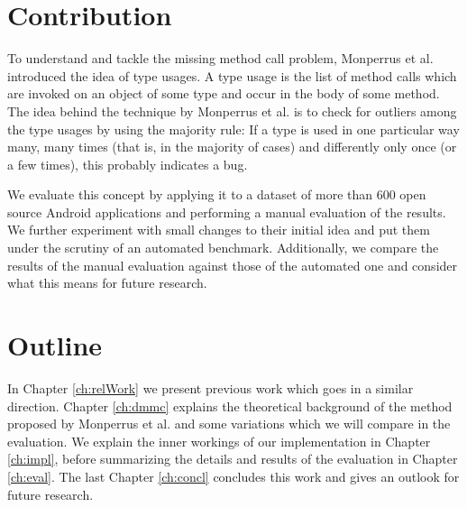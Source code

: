 
\section{Contribution}

To understand and tackle the missing method call problem, Monperrus et al. \cite{monperrus2010detecting}\cite{monperrus2013detecting} introduced the idea of type usages.
A type usage is the list of method calls which are invoked on an object of some type and occur in the body of some method.
The idea behind the technique by Monperrus et al. is to check for outliers among the type usages by using the majority rule:
If a type is used in one particular way many, many times (that is, in the majority of cases) and differently only once (or a few times), this probably indicates a bug.

We evaluate this concept by applying it to a dataset of more than 600 open source Android applications and performing a manual evaluation of the results.
We further experiment with small changes to their initial idea and put them under the scrutiny of an automated benchmark.
Additionally, we compare the results of the manual evaluation against those of the automated one and consider what this means for future research.

\section{Outline}
In Chapter \ref{ch:relWork} we present previous work which goes in a similar direction.
Chapter \ref{ch:dmmc} explains the theoretical background of the method proposed by Monperrus et al. and some variations which we will compare in the evaluation.
We explain the inner workings of our implementation in Chapter \ref{ch:impl}, before summarizing the details and results of the evaluation in Chapter \ref{ch:eval}.
The last Chapter \ref{ch:concl} concludes this work and gives an outlook for future research.

